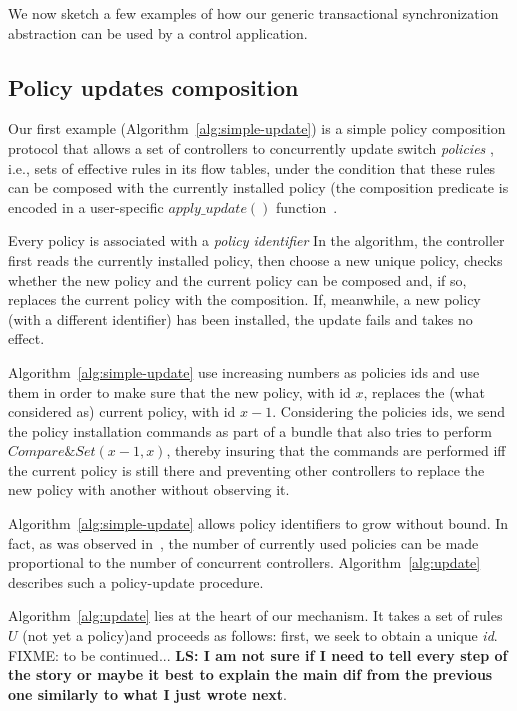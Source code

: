 \documentclass[conference]{sigcomm-alternate}
\begin{document}
We now sketch a few examples of how our generic transactional synchronization
abstraction  can be used by a control application.

\subsection{Policy updates composition}

Our first example (Algorithm~\ref{alg:simple-update}) is a simple policy composition protocol that
allows a set of  controllers to concurrently update switch  \emph{policies} , i.e., sets of
effective rules in its flow tables, under the
condition that these rules can be composed with the currently installed
policy (the composition predicate is encoded in a user-specific
$\textit{apply\_update}()$ function~\cite{cpc}.  

Every policy is associated with a \emph{policy identifier} 
In the algorithm, the controller first reads the currently installed
policy, then choose a new unique policy, checks whether the new
policy and the current policy can be composed and, if so, replaces the
current policy with the composition. If, meanwhile, a new
policy (with a different identifier) has been installed, the update
fails and takes no effect. 

Algorithm~\ref{alg:simple-update} use increasing numbers as policies ids and use them in order to make sure that the new policy, with id $x$, replaces the (what considered as) current policy, with id $x-1$. Considering the policies ids, we send the policy installation commands as part of a bundle that also tries to perform  $Compare\&Set(x-1,x)$, thereby insuring that the commands are performed iff the current policy is still there and preventing other controllers to replace the new policy with another without observing it.

Algorithm~\ref{alg:simple-update} allows policy identifiers to grow
without bound. In fact, as was observed in~\cite{cpc}, the number of currently
used policies can be made proportional to the number of concurrent controllers.
Algorithm~\ref{alg:update} describes such a policy-update procedure.
 
 
 Algorithm~\ref{alg:update} lies at the heart of our mechanism.
 It takes a set of rules $U$ (not yet a policy)and proceeds as follows: first, we seek to
 obtain a unique \emph{id}. FIXME: to be continued...
 \textbf{LS: I am not sure if I need to tell every step of the story or maybe it best to explain the main dif from the previous one similarly to what I just wrote next}.
 
\end{document}
